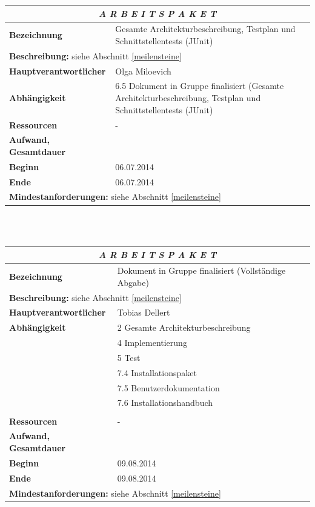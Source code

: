 \documentclass[fontsize=12pt,paper=a4,twoside]{scrartcl}
\begin{document}
\begin{tabular}{p{7.5cm}|p{7.5cm}}\toprule
\multicolumn{2}{c}{\textbf{\textit{A R B E I T S P A K E T \quad 6.6}}} \\ \toprule \hline
\textbf{Bezeichnung} & Gesamte Architekturbeschreibung, Testplan und Schnittstellentests (JUnit)\\\hline
\multicolumn{2}{p{15cm}}{\textbf{Beschreibung:} \newline 
siehe Abschnitt \ref{meilensteine} }  \\\hline
\textbf{Hauptverantwortlicher} & Olga Miloevich \\\hline
\textbf{Abhängigkeit} & 6.5 Dokument in Gruppe finalisiert (Gesamte Architekturbeschreibung, Testplan und Schnittstellentests (JUnit)\\\hline
\textbf{Ressourcen} & -\\\hline
\textbf{Aufwand, Gesamtdauer} & \\\hline
\textbf{Beginn} & 06.07.2014 \\\hline
\textbf{Ende} & 06.07.2014\\\hline
\multicolumn{2}{p{15cm}}{\textbf{Mindestanforderungen: } \newline
siehe Abschnitt \ref{meilensteine}}  \\ \toprule
\end{tabular} \\\\

\begin{tabular}{p{7.5cm}|p{7.5cm}}\toprule
\multicolumn{2}{c}{\textbf{\textit{A R B E I T S P A K E T \quad 6.7}}} \\ \toprule \hline
\textbf{Bezeichnung} & Dokument in Gruppe finalisiert (Vollständige Abgabe)\\\hline
\multicolumn{2}{p{15cm}}{\textbf{Beschreibung:} \newline 
siehe Abschnitt \ref{meilensteine} }  \\\hline
\textbf{Hauptverantwortlicher} & Tobias Dellert \\\hline
\textbf{Abhängigkeit} & 2 Gesamte Architekturbeschreibung \\
& 4 Implementierung \\
& 5 Test \\
& 7.4 Installationspaket \\
& 7.5 Benutzerdokumentation \\
& 7.6 Installationshandbuch \\
\\\hline
\textbf{Ressourcen} & -\\\hline
\textbf{Aufwand, Gesamtdauer} & \\\hline
\textbf{Beginn} & 09.08.2014 \\\hline
\textbf{Ende} & 09.08.2014\\\hline
\multicolumn{2}{p{15cm}}{\textbf{Mindestanforderungen: } \newline
siehe Abschnitt \ref{meilensteine}}  \\ \toprule
\end{tabular} \\\\
\end{document}
